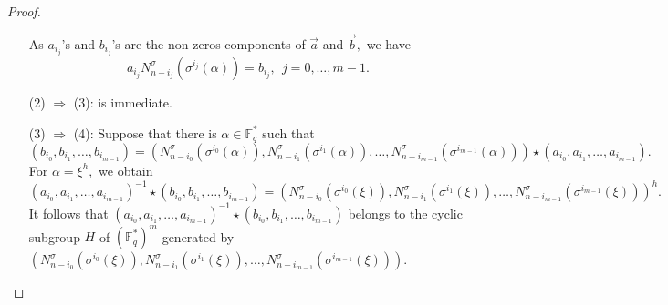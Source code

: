 \documentclass[12pt,paper]{article}
\theoremstyle{plain}
\newcommand{\Fq}{\mathbb{F}_{q}}
\begin{document}
\begin{proof}
\begin{itemize}
As  $ a_{i_j}$'s and $  b_{i_j}$'s are the non-zeros components of $\vec{a}$ and $\vec{b},$  we have
$$ a_{i_j} N_{n-{i_j}}^{\sigma}(\sigma^{i_j}(\alpha)) = b_{i_j},\  \ j=0,\ldots,m-1.$$

 \item[(2) $\Rightarrow$ (3):]  is immediate. 

 \item[(3) $\Rightarrow$ (4):]
Suppose that there is $\alpha\in \Fq^{*}$ such that 
$$  (b_{i_0}, b_{i_1},\ldots, b_{i_{m-1}} )=  \left( N_{n-i_0}^{\sigma}(\sigma^{i_0}(\alpha)), 
N^{\sigma}_{n-i_1}(\sigma^{i_1}(\alpha)), \ldots, N^{\sigma}_{n-i_{m-1}}(\sigma^{i_{m-1}}(\alpha))\right)\star ( a_{i_0},  a_{i_1}, \ldots, a_{i_{m-1}}).$$ 
For $\alpha= \xi^h,$ we obtain 
$$  ( a_{i_0}, a_{i_1},\ldots, a_{i_{m-1}})^{-1}\star (b_{i_0}, b_{i_1},\ldots, b_{i_{m-1}} ) =   \left( N_{n-i_0}^{\sigma}(\sigma^{i_0}(\xi)), 
N^{\sigma}_{n-i_1}(\sigma^{i_1}(\xi)), \ldots, N^{\sigma}_{n-i_{m-1}}(\sigma^{i_{m-1}}(\xi))\right)^h .$$
It follows that $  ( a_{i_0},  a_{i_1}, \ldots, a_{i_{m-1}})^{-1}\star ( b_{i_0},  b_{i_1}, \ldots, b_{i_{m-1}}) $ belongs to the cyclic subgroup  $H$ of $ (\Fq^{*})^m$ generated by $ \left( N_{n-i_0}^{\sigma}(\sigma^{i_0}(\xi)), 
N^{\sigma}_{n-i_1}(\sigma^{i_1}(\xi)), \ldots, N^{\sigma}_{n-i_{m-1}}(\sigma^{i_{m-1}}(\xi))\right).$
   

\end{itemize}
\end{proof}
\end{document}
